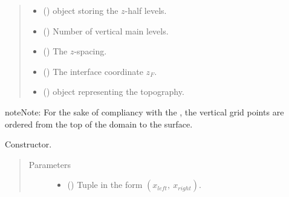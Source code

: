 \documentclass[letterpaper,10pt,english]{sphinxmanual}
\begin{document}
\begin{fulllineitems}
\begin{quote}
\begin{description}
\begin{itemize}
\item {} 
 () \textendash{} {\hyperref[\detokenize{api:grids.axis.Axis}]{}} object storing the \(z\)-half levels.

\item {} 
 () \textendash{} Number of vertical main levels.

\item {} 
 () \textendash{} The \(z\)-spacing.

\item {} 
 () \textendash{} The interface coordinate \(z_F\).

\item {} 
{\hyperref[\detokenize{api:module-grids.topography}]{}} () \textendash{} {\hyperref[\detokenize{api:grids.topography.Topography1d}]{}} object representing
the topography.

\end{itemize}

\end{description}\end{quote}

\begin{sphinxadmonition}{note}{Note:}
For the sake of compliancy with the ,
the vertical grid points are ordered from the top of the domain to the surface.
\end{sphinxadmonition}

\begin{fulllineitems}
\label{\detokenize{api:grids.xz_grid.XZGrid.__init__}}
Constructor.
\begin{quote}\begin{description}
\item[{Parameters}] \leavevmode\begin{itemize}
\item {} 
 () \textendash{} Tuple in the form \((x_{left}, ~ x_{right})\).


\end{itemize}
\end{description}
\end{quote}
\end{fulllineitems}
\end{fulllineitems}
\end{document}
